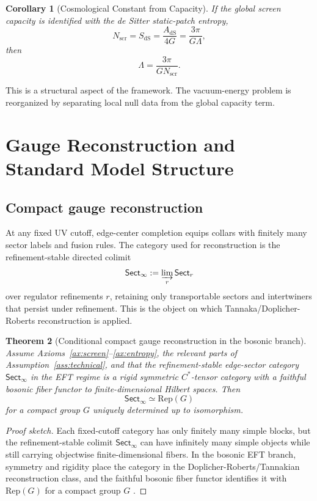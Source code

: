 \documentclass[11pt]{article}
\newtheorem{theorem}{Theorem}[section]
\newtheorem{corollary}[theorem]{Corollary}
\begin{document}
\begin{corollary}[Cosmological Constant from Capacity]\label{cor:lambda}
If the global screen capacity is identified with the de Sitter static-patch entropy,
\[
N_{\mathrm{scr}}=S_{\mathrm{dS}}=\frac{A_{\mathrm{dS}}}{4G}=\frac{3\pi}{G\Lambda},
\]
then
\[
\Lambda=\frac{3\pi}{G N_{\mathrm{scr}}}.
\]
\end{corollary}

This is a structural aspect of the framework. The vacuum-energy problem is reorganized by separating local null data from the global capacity term.

\section{Gauge Reconstruction and Standard Model Structure}

\subsection{Compact gauge reconstruction}

At any fixed UV cutoff, edge-center completion equips collars with finitely many sector labels and fusion rules. The category used for reconstruction is the refinement-stable directed colimit
\[
\mathsf{Sect}_\infty := \varinjlim_r \mathsf{Sect}_r
\]
over regulator refinements $r$, retaining only transportable sectors and intertwiners that persist under refinement. This is the object on which Tannaka/Doplicher-Roberts reconstruction is applied.

\begin{theorem}[Conditional compact gauge reconstruction in the bosonic branch]\label{thm:compactgauge}
Assume Axioms~\ref{ax:screen}--\ref{ax:entropy}, the relevant parts of Assumption~\ref{ass:technical}, and that the refinement-stable edge-sector category $\mathsf{Sect}_\infty$ in the EFT regime is a rigid symmetric $C^*$-tensor category with a faithful bosonic fiber functor to finite-dimensional Hilbert spaces. Then
\[
\mathsf{Sect}_\infty\simeq \mathrm{Rep}(G)
\]
for a compact group $G$ uniquely determined up to isomorphism.
\end{theorem}

\begin{proof}[Proof sketch]
Each fixed-cutoff category has only finitely many simple blocks, but the refinement-stable colimit $\mathsf{Sect}_\infty$ can have infinitely many simple objects while still carrying objectwise finite-dimensional fibers. In the bosonic EFT branch, symmetry and rigidity place the category in the Doplicher-Roberts/Tannakian reconstruction class, and the faithful bosonic fiber functor identifies it with $\mathrm{Rep}(G)$ for a compact group $G$ \cite{DR89,DR90}.
\end{proof}
\end{document}

